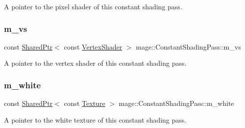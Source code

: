 A pointer to the pixel shader of this constant shading pass. \hypertarget{classmage_1_1_constant_shading_pass_a2c03eec34054038e54b4837c4e23812c}{}\label{classmage_1_1_constant_shading_pass_a2c03eec34054038e54b4837c4e23812c} 
\subsubsection{\texorpdfstring{m\+\_\+vs}{m\_vs}}
{\footnotesize\ttfamily const \hyperlink{namespacemage_a1e01ae66713838a7a67d30e44c67703e}{Shared\+Ptr}$<$ const \hyperlink{classmage_1_1_vertex_shader}{Vertex\+Shader} $>$ mage\+::\+Constant\+Shading\+Pass\+::m\+\_\+vs\hspace{0.3cm}{\ttfamily [private]}}

A pointer to the vertex shader of this constant shading pass. \hypertarget{classmage_1_1_constant_shading_pass_aa5c9222b0de16e351b90752150d584d1}{}\label{classmage_1_1_constant_shading_pass_aa5c9222b0de16e351b90752150d584d1} 
\subsubsection{\texorpdfstring{m\+\_\+white}{m\_white}}
{\footnotesize\ttfamily const \hyperlink{namespacemage_a1e01ae66713838a7a67d30e44c67703e}{Shared\+Ptr}$<$ const \hyperlink{classmage_1_1_texture}{Texture} $>$ mage\+::\+Constant\+Shading\+Pass\+::m\+\_\+white\hspace{0.3cm}{\ttfamily [private]}}

A pointer to the white texture of this constant shading pass. 